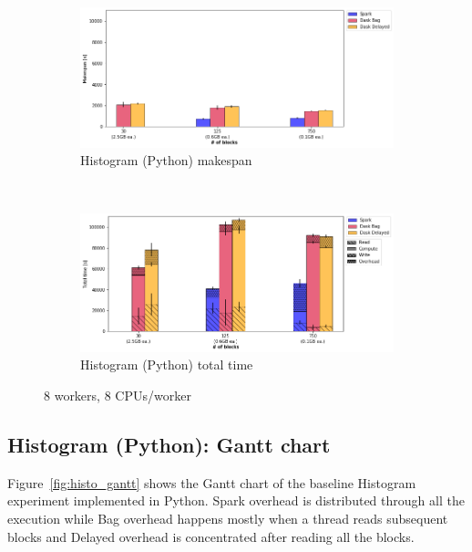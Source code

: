 \documentclass[conference]{IEEEtran}
\newcommand{\TG}[1]{\color{cyan}From Tristan: #1 \color{black}}
\begin{document}
\begin{figure}[!b]
    \centering
    \begin{subfigure}[b]{\columnwidth}
        \includegraphics[clip,width=\columnwidth]{images/histo_block.png}%
        \caption{Histogram (Python) makespan}\label{fig:histo_ms_block}
    \end{subfigure}
    \\
    \begin{subfigure}[b]{\columnwidth}
        \includegraphics[clip,width=\columnwidth]{images/histo_idle_block.png}%
        \caption{Histogram (Python) total time}\label{fig:histo_tt_block}
    \end{subfigure}
    \caption{8 workers, 8 CPUs/worker}\label{fig:histo_block}
\end{figure}

\subsection{Histogram (Python): Gantt chart}
Figure~\ref{fig:histo_gantt} shows the Gantt chart of the baseline
Histogram experiment implemented in Python. Spark overhead is distributed
through all the execution while Bag overhead happens mostly when a thread
reads subsequent blocks and Delayed overhead is concentrated after reading
all the blocks.
\end{document}
